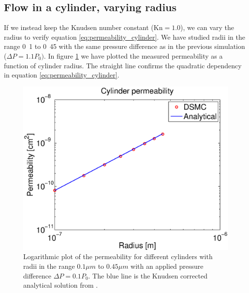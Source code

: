 \subsection{Flow in a cylinder, varying radius}
If we instead keep the Knudsen number constant ($\text{Kn}=1.0$), we can vary the radius to verify equation \eqref{eq:permeability_cylinder}. We have studied radii in the range \unit{0.1}{\micro\meter} to \unit{0.45}{\micro\meter} with the same pressure difference as in the previous simulation ($\Delta P = 1.1P_0)$. In figure \ref{fig:one_cylinder_varying_radii_result} we have plotted the measured permeability as a function of cylinder radius. The straight line confirms the quadratic dependency in equation \eqref{eq:permeability_cylinder}.
\begin{figure}[h]
\begin{center}
\includegraphics[width=\textwidth, trim=0cm 0cm 0cm 0cm, clip]{DSMC/figures/cylinder_radius_permeability.eps}
\end{center}
\caption{Logarithmic plot of the permeability for different cylinders with radii in the range $0.1 \mu m$ to $0.45 \mu m$ with an applied pressure difference $\Delta P = 0.1P_0$. The blue line is the Knudsen corrected analytical solution from \cite{karniadakis2005microflows}.}
\label{fig:one_cylinder_varying_radii_result}
\end{figure}

